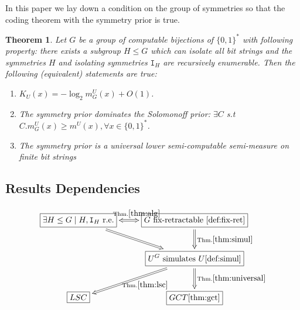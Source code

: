 \documentclass{article}
\newtheorem{theorem}{Theorem}[section]
\newcommand{\bin}{\{0,1\}^*} %
\newcommand{\I}{\mathtt{I}}
\newcommand{\m}{m^U}
\newcommand{\ms}{m^U_G}
\begin{document}
In this paper we lay down a condition on the group of symmetries so that the coding theorem with the symmetry prior is true. 

\begin{theorem}
    \label{thm:gct}
    Let $G$ be a group of computable bijections of $\bin$ with following property: there exists a subgroup $H \leq G$ which can isolate all bit strings and the symmetries $H$ and isolating symmetries $\I_H$ are recursively enumerable. Then the following (equivalent) statements are true:
    \begin{enumerate}
        \item $K_U(x) = -\log_2 \ms(x) + O(1)$.
        \item The symmetry prior dominates the Solomonoff prior: $\exists C$ s.t $C.\ms(x) \geq \m(x), \forall x \in \bin$. 
        \item The symmetry prior is a universal lower semi-computable semi-measure on finite bit strings
    \end{enumerate}
\end{theorem}

\subsection{Results Dependencies}


\begin{equation}
\xymatrix{
\boxed{\exists H \leq G \mid  H, \I_H \text{ r.e.}} \ar@{=>}[dr] \ar@{<=>}[r]^{\text{Thm.}\ref{thm:alg}} &\boxed{G \text{ fix-retractable } \ref{def:fix-ret}}\ar@{=>}[d]^{\text{Thm.}\ref{thm:simul}}\\
&\boxed{U^G \text{ simulates } U \ref{def:simul}} \ar@{=>}[d]^{\text{Thm.}\ref{thm:universal}} \ar@{=>}[dl]^{\text{Thm.}\ref{thm:lsc}}\\
\boxed{LSC}  &\boxed{GCT \ref{thm:gct}} \\
}
\end{equation}
\end{document}
